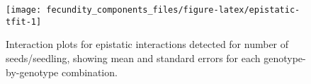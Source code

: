 \documentclass[]{article}
\begin{document}
\newpage

\begin{figure}

{\centering \texttt{[image: fecundity\_components\_files/figure-latex/epistatic-tfit-1]} 

}

\caption[Epistatic interactions for number of seeds/seedling]{Interaction plots for epistatic interactions detected for number of seeds/seedling, showing mean and standard errors for each genotype-by-genotype combination.}\label{fig:epistatic-tfit}
\end{figure}
\end{document}
